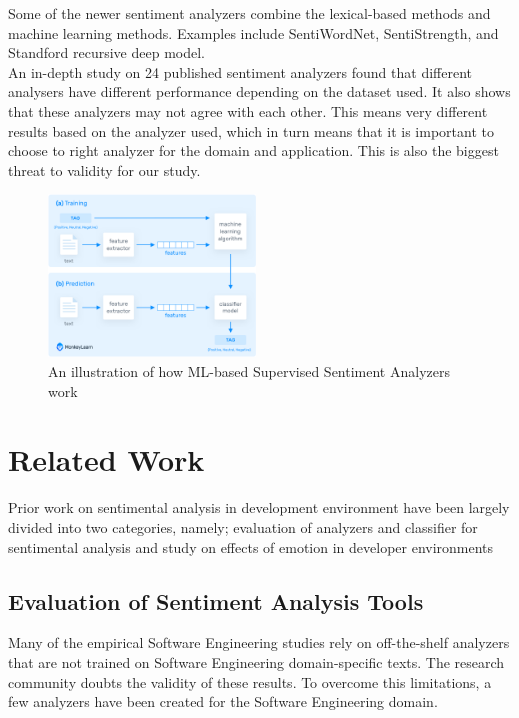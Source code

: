 \documentclass[conference]{IEEEtran}
\begin{document}
Some of the newer sentiment analyzers combine the lexical-based methods and machine learning methods. Examples include SentiWordNet\cite{b15}, SentiStrength\cite{b16}, and Standford recursive deep model\cite{b17}.\\

An in-depth study on 24 published sentiment analyzers found that different analysers have different performance depending on the dataset used.\cite{b13} It also shows that these analyzers may not agree with each other. This means very different results based on the analyzer used, which in turn means that it is important to choose to right analyzer for the domain and application. This is also the biggest threat to validity for our study.\\

\begin{figure}[htbp]
\centerline{\includegraphics[width=0.49\textwidth]{figures/how-does-sentiment-analysis-work.png}}
\caption{An illustration of how ML-based Supervised Sentiment Analyzers work\cite{b32}}
\label{fig}
\end{figure}

\section{Related Work}
Prior work on sentimental analysis in development environment have been largely divided into two categories, namely; evaluation of analyzers and classifier for sentimental analysis and study on effects of emotion in developer environments\\


\subsection{Evaluation of Sentiment Analysis Tools}
Many of the empirical Software Engineering studies rely on off-the-shelf analyzers that are not trained on Software Engineering domain-specific texts. The research community doubts the validity of these results\cite{b21}. To overcome this limitations, a few analyzers have been created for the Software Engineering domain.\\ 
\end{document}
